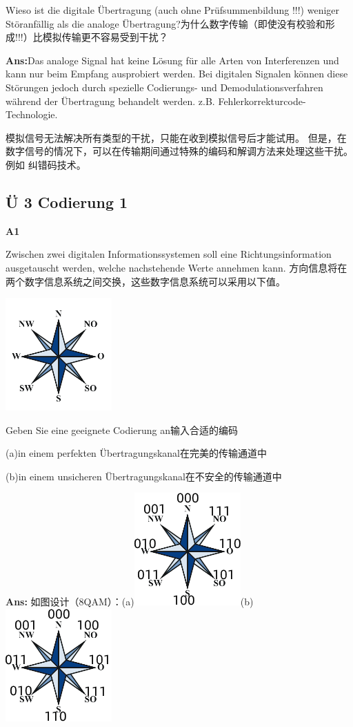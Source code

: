 \documentclass[fleqn]{article}
\begin{document}
Wieso ist die digitale Übertragung (auch ohne Prüfsummenbildung !!!) weniger Störanfällig als die analoge Übertragung?为什么数字传输（即使没有校验和形成!!!）比模拟传输更不容易受到干扰？

\textbf{Ans:}Das analoge Signal hat keine Lösung für alle Arten von Interferenzen und kann nur beim Empfang ausprobiert werden.
Bei digitalen Signalen können diese Störungen jedoch durch spezielle Codierungs- und Demodulationsverfahren während der Übertragung behandelt werden.
z.B. Fehlerkorrekturcode-Technologie.

模拟信号无法解决所有类型的干扰，只能在收到模拟信号后才能试用。
但是，在数字信号的情况下，可以在传输期间通过特殊的编码和解调方法来处理这些干扰。
例如 纠错码技术。

\subsection{Ü 3 Codierung 1}

\noindent\textbf{A1}

Zwischen zwei digitalen Informationssystemen soll eine Richtungsinformation ausgetauscht werden, welche nachstehende Werte annehmen kann.
方向信息将在两个数字信息系统之间交换，这些数字信息系统可以采用以下值。

\begin{center}
    \includegraphics[scale=0.5]{bild8.png}
\end{center}

Geben Sie eine geeignete Codierung an输入合适的编码

(a)in einem perfekten Übertragungskanal在完美的传输通道中

(b)in einem unsicheren Übertragungskanal在不安全的传输通道中

\textbf{Ans:} 如图设计（8QAM）：(a)\includegraphics[scale=0.5]{bild12.png}(b)\includegraphics[scale=0.5]{bild11.png}
\end{document}
